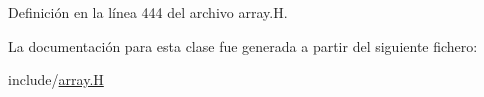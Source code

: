 Definición en la línea 444 del archivo array.\+H.



La documentación para esta clase fue generada a partir del siguiente fichero\+:\begin{DoxyCompactItemize}
\item 
include/\hyperlink{array_8_h}{array.\+H}\end{DoxyCompactItemize}
